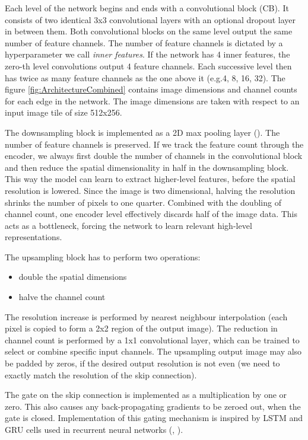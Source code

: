 Each level of the network begins and ends with a convolutional block (CB). It consists of two identical 3x3 convolutional layers with an optional dropout layer in between them. Both convolutional blocks on the same level output the same number of feature channels. The number of feature channels is dictated by a hyperparameter we call \emph{inner features}. If the network has 4 inner features, the zero-th level convolutions output 4 feature channels. Each successive level then has twice as many feature channels as the one above it (e.g.\@ 4, 8, 16, 32). The figure \ref{fig:ArchitectureCombined} contains image dimensions and channel counts for each edge in the network. The image dimensions are taken with respect to an input image tile of size 512x256.

The downsampling block is implemented as a 2D max pooling layer (\cite{DeepLearningBook}). The number of feature channels is preserved. If we track the feature count through the encoder, we always first double the number of channels in the convolutional block and then reduce the spatial dimensionality in half in the downsampling block. This way the model can learn to extract higher-level features, before the spatial resolution is lowered. Since the image is two dimensional, halving the resolution shrinks the number of pixels to one quarter. Combined with the doubling of channel count, one encoder level effectively discards half of the image data. This acts as a bottleneck, forcing the network to learn relevant high-level representations.

The upsampling block has to perform two operations:

\begin{itemize}
    \item double the spatial dimensions
    \item halve the channel count
\end{itemize}

The resolution increase is performed by nearest neighbour interpolation (each pixel is copied to form a 2x2 region of the output image). The reduction in channel count is performed by a 1x1 convolutional layer, which can be trained to select or combine specific input channels. The upsampling output image may also be padded by zeros, if the desired output resolution is not even (we need to exactly match the resolution of the skip connection).

The gate on the skip connection is implemented as a multiplication by one or zero. This also causes any back-propagating gradients to be zeroed out, when the gate is closed. Implementation of this gating mechanism is inspired by LSTM and GRU cells used in recurrent neural networks (\cite{LSTM}, \cite{GRU}).

